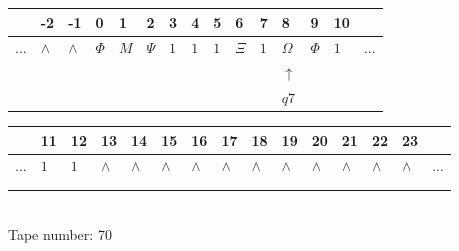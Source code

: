 \documentclass[11pt]{article}
\begin{document}
\begin{table}[H]
\centering
\begin{tabular}{lllllllllllllll}
 & -2 & -1 & 0 & 1 & 2 & 3 & 4 & 5 & 6 & 7 & 8 & 9 & 10 & \\
\hline
$...$ & \multicolumn{1}{|l|}{$\wedge$} & \multicolumn{1}{|l|}{$\wedge$} & \multicolumn{1}{|l|}{$\Phi$} & \multicolumn{1}{|l|}{$M$} & \multicolumn{1}{|l|}{$\Psi$} & \multicolumn{1}{|l|}{$1$} & \multicolumn{1}{|l|}{$1$} & \multicolumn{1}{|l|}{$1$} & \multicolumn{1}{|l|}{$\Xi$} & \multicolumn{1}{|l|}{$1$} & \multicolumn{1}{|l|}{$\Omega$} & \multicolumn{1}{|l|}{$\Phi$} & \multicolumn{1}{|l|}{$1$} & $...$\\
\hline
&  &  &  &  &  &  &  &  &  &  & $\uparrow$ &  &  &  \\
&  &  &  &  &  &  &  &  &  &  & $ q7 $ &  &  &  \\
\end{tabular}
\begin{tabular}{lllllllllllllll}
 & 11 & 12 & 13 & 14 & 15 & 16 & 17 & 18 & 19 & 20 & 21 & 22 & 23 & \\
\hline
$...$ & \multicolumn{1}{|l|}{$1$} & \multicolumn{1}{|l|}{$1$} & \multicolumn{1}{|l|}{$\wedge$} & \multicolumn{1}{|l|}{$\wedge$} & \multicolumn{1}{|l|}{$\wedge$} & \multicolumn{1}{|l|}{$\wedge$} & \multicolumn{1}{|l|}{$\wedge$} & \multicolumn{1}{|l|}{$\wedge$} & \multicolumn{1}{|l|}{$\wedge$} & \multicolumn{1}{|l|}{$\wedge$} & \multicolumn{1}{|l|}{$\wedge$} & \multicolumn{1}{|l|}{$\wedge$} & \multicolumn{1}{|l|}{$\wedge$} & $...$\\
\hline
&  &  &  &  &  &  &  &  &  &  &  &  &  &  \\
&  &  &  &  &  &  &  &  &  &  &  &  &  &  \\
\end{tabular}
\\
Tape number: 70
\noindent\makebox[\linewidth]{\hdashrule{\textwidth}{1pt}{1pt}}\end{table}
\end{document}
